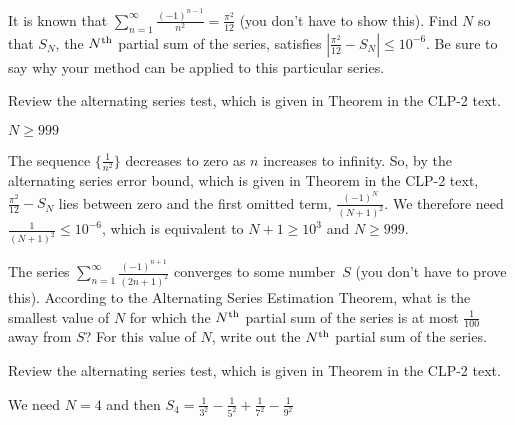 \begin{Mquestion}[2016Q5]
It is known that $\displaystyle \sum_{n=1}^\infty \frac{(-1)^{n-1}}{n^2} = \frac{\pi^2}{12}$
(you don't have to show this).
Find $N$ so that $S_N$, the $N^{\rm th}$ partial sum of the series, satisfies
$| \frac{\pi^2}{12} - S_N | \le 10^{-6}$. Be sure to say why your method can be
applied to this particular series.
\end{Mquestion}

\begin{hint}
Review the alternating series test, which is given in
Theorem  in the
CLP-2 text.
\end{hint}

\begin{answer}
$N\geq 999$
\end{answer}

\begin{solution}
The sequence $\{\frac{1}{n^2}\}$ decreases to zero as $n$ increases to infinity.
So, by the alternating series error bound, which is given in
Theorem  in the
CLP-2 text, $\frac{\pi^2}{12}-S_N$ lies between zero and
the first omitted term, $ \frac{(-1)^{N}}{(N+1)^2}$.
We therefore need $\frac{1}{(N+1)^2} \leq 10^{-6}$,
which is equivalent to $N+1 \geq 10^3$ and $N\geq 999$.
\end{solution}




\begin{question}[2015A]
The series $\displaystyle \sum_{n=1}^\infty \frac{(-1)^{n+1}}{(2n+1)^2}$ converges to some number~$S$ (you don't have to prove this). According to the Alternating Series Estimation Theorem, what is the smallest value of $N$ for which the $N^{\rm th}$
partial sum of the series is at most $\frac1{100}$ away from $S$? For this value of $N$,
write out the $N^{\rm th}$ partial sum of the series.
\end{question}

\begin{hint}
Review the alternating series test, which is given in
Theorem  in the
CLP-2 text.
\end{hint}

\begin{answer}
We need  $N=4$ and then
$
   S_4= \frac{1}{3^2}-\frac{1}{5^2} +\frac{1}{7^2} -\frac{1}{9^2}
$
\end{answer}

